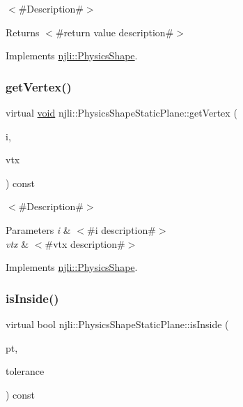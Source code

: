 $<$\#\+Description\#$>$

\begin{DoxyReturn}{Returns}
$<$\#return value description\#$>$ 
\end{DoxyReturn}


Implements \mbox{\hyperlink{classnjli_1_1_physics_shape_ac7c6b2ac373892095f8220d56f8ad6de}{njli\+::\+Physics\+Shape}}.

\mbox{\label{classnjli_1_1_physics_shape_static_plane_ad6a9435112a9d9ebe56b0db5f8b2f5ce}} 
\subsubsection{\texorpdfstring{get\+Vertex()}{getVertex()}}
{\footnotesize\ttfamily virtual \mbox{\hyperlink{_thread_8h_af1e856da2e658414cb2456cb6f7ebc66}{void}} njli\+::\+Physics\+Shape\+Static\+Plane\+::get\+Vertex (\begin{DoxyParamCaption}\item[{int}]{i,  }\item[{bt\+Vector3 \&}]{vtx }\end{DoxyParamCaption}) const\hspace{0.3cm}{\ttfamily [virtual]}}

$<$\#\+Description\#$>$


\begin{DoxyParams}{Parameters}
{\em i} & $<$\#i description\#$>$ \\
\hline
{\em vtx} & $<$\#vtx description\#$>$ \\
\hline
\end{DoxyParams}


Implements \mbox{\hyperlink{classnjli_1_1_physics_shape_acb05a16bdbfa5cee6dcbab5c253eb78e}{njli\+::\+Physics\+Shape}}.

\mbox{\label{classnjli_1_1_physics_shape_static_plane_abee3513f871d8a14e23d06e6cdc5827a}} 
\subsubsection{\texorpdfstring{is\+Inside()}{isInside()}}
{\footnotesize\ttfamily virtual bool njli\+::\+Physics\+Shape\+Static\+Plane\+::is\+Inside (\begin{DoxyParamCaption}\item[{const bt\+Vector3 \&}]{pt,  }\item[{\mbox{\hyperlink{_util_8h_a5f6906312a689f27d70e9d086649d3fd}{f32}}}]{tolerance }\end{DoxyParamCaption}) const\hspace{0.3cm}{\ttfamily [virtual]}}

